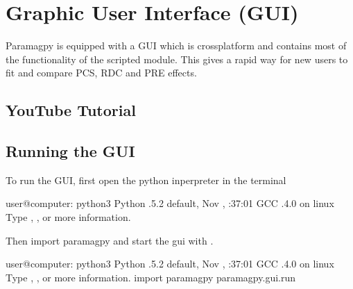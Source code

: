\documentclass[a4paper,10pt,english,openany,oneside]{sphinxmanual}
\begin{document}
\noindent{}


\section{Graphic User Interface (GUI)}
\label{\detokenize{paramagpy_gui:graphic-user-interface-gui}}\label{\detokenize{paramagpy_gui:paramagpy-gui}}\label{\detokenize{paramagpy_gui::doc}}
\sphinxAtStartPar
Paramagpy is equipped with a GUI which is cross\sphinxhyphen{}platform and contains most of the functionality of the scripted module. This gives a rapid way for new users to fit and compare PCS, RDC and PRE effects.


\subsection{YouTube Tutorial}
\label{\detokenize{paramagpy_gui:youtube-tutorial}}
\sphinxAtStartPar
{}




\subsection{Running the GUI}
\label{\detokenize{paramagpy_gui:running-the-gui}}
\sphinxAtStartPar
To run the GUI, first open the python inperpreter in the terminal

\begin{sphinxVerbatim}[commandchars=\\\{\}]
user@computer:\PYGZti{}\PYGZdl{} python3
Python .5.2 default, Nov  , :37:01
\PYG{o}{[}GCC .4.0 \PYG{o}{]} on linux
Type , ,  or   more information.
\PYGZgt{}\PYGZgt{}\PYGZgt{}
\end{sphinxVerbatim}

\sphinxAtStartPar
Then import paramagpy and start the gui with .

\begin{sphinxVerbatim}[commandchars=\\\{\}]
user@computer:\PYGZti{}\PYGZdl{} python3
Python .5.2 default, Nov  , :37:01
\PYG{o}{[}GCC .4.0 \PYG{o}{]} on linux
Type , ,  or   more information.
\PYGZgt{}\PYGZgt{}\PYGZgt{} import paramagpy
\PYGZgt{}\PYGZgt{}\PYGZgt{} paramagpy.gui.run
\end{sphinxVerbatim}
\end{document}
